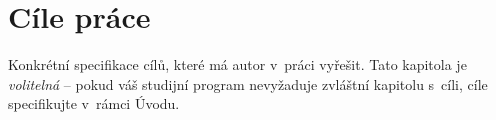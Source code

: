 \chapter*{Cíle práce}
{}

Konkrétní specifikace cílů, které má autor v~práci vyřešit.
Tato kapitola je \emph{volitelná} -- pokud váš studijní program nevyžaduje zvláštní kapitolu s~cíli,
cíle specifikujte v~rámci Úvodu.